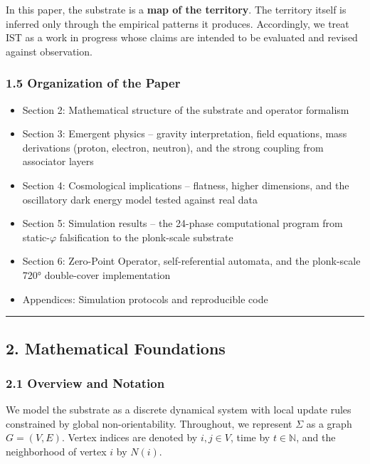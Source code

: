 \documentclass[
]{article}
\providecommand{\tightlist}{%
  \setlength{\itemsep}{0pt}\setlength{\parskip}{0pt}}
\begin{document}
In this paper, the substrate is a \textbf{map of the territory}. The
territory itself is inferred only through the empirical patterns it
produces. Accordingly, we treat IST as a work in progress whose claims
are intended to be evaluated and revised against observation.

\subsubsection{1.5 Organization of the
Paper}\label{organization-of-the-paper}

\begin{itemize}
\tightlist
\item
  Section 2: Mathematical structure of the substrate and operator
  formalism
\item
  Section 3: Emergent physics -- gravity interpretation, field
  equations, mass derivations (proton, electron, neutron), and the
  strong coupling from associator layers
\item
  Section 4: Cosmological implications -- flatness, higher dimensions,
  and the oscillatory dark energy model tested against real data
\item
  Section 5: Simulation results -- the 24-phase computational program
  from static-\(\varphi\) falsification to the plonk-scale substrate
\item
  Section 6: Zero-Point Operator, self-referential automata, and the
  plonk-scale 720° double-cover implementation
\item
  Appendices: Simulation protocols and reproducible code
\end{itemize}

\begin{center}\rule{0.5\linewidth}{0.5pt}\end{center}

\subsection{2. Mathematical Foundations}\label{mathematical-foundations}

\subsubsection{2.1 Overview and Notation}\label{overview-and-notation}

We model the substrate as a discrete dynamical system with local update
rules constrained by global non-orientability. Throughout, we represent
\(\Sigma\) as a graph \(G = (V, E)\). Vertex indices are denoted by
\(i, j \in V\), time by \(t \in \mathbb{N}\), and the neighborhood of
vertex \(i\) by \(N(i)\).
\end{document}
